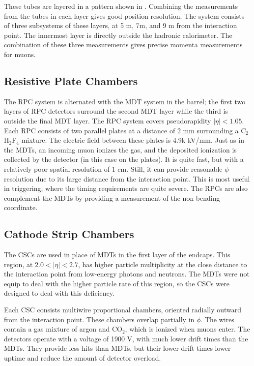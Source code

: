 These tubes are layered in a pattern shown in .
Combining the measurements from the tubes in each layer gives good position resolution.
The system consists of three subsystems of these layers, at 5 m, 7m, and 9 m from the interaction point.
The innermost layer is directly outside the hadronic calorimeter.
The combination of these three measurements gives precise momenta measurements for muons.

\subsection{Resistive Plate Chambers}

The RPC system is alternated with the MDT system in the barrel; the first two layers of RPC detectors surround the second MDT layer while the third is outside the final MDT layer.
The RPC system covers pseudorapidity $|\eta| < 1.05 $.
Each RPC consists of two parallel plates at a distance of 2 mm surrounding a C$_2$H$_2$F$_4$ mixture.
The electric field between these plates is 4.9k kV/mm.
Just as in the MDTs, an incoming muon ionizes the gas, and the deposited ionization is collected by the detector (in this case on the plates).
It is quite fast, but with a relatively poor spatial resolution of 1 cm.
Still, it can provide reasonable $\phi$ resolution due to its large distance from the interaction point.
This is most useful in triggering, where the timing requirements are quite severe.
The RPCs are also complement the MDTs by providing a measurement of the non-bending coordinate.

\subsection{Cathode Strip Chambers}

The CSCs are used in place of MDTs in the first layer of the endcaps.
This region, at $2.0 < |\eta| < 2.7$, has higher particle multiplicity at the close distance to the interaction point from low-energy photons and neutrons.
The MDTs were not equip to deal with the higher particle rate of this region, so the CSCs were designed to deal with this deficiency.

Each CSC consists multiwire proportional chambers, oriented radially outward from the interaction point.
These chambers overlap partially in $\phi$.
The wires contain a gas mixture of argon and CO$_2$, which is ionized when muons enter.
The detectors operate with a voltage of 1900 V, with much lower drift times than the MDTs.
They provide less hits than MDTs, but their lower drift times lower uptime and reduce the amount of detector overload.

